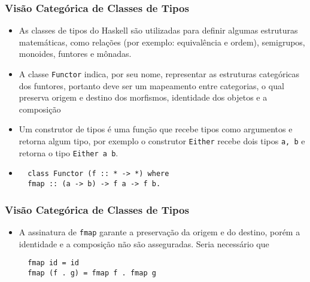 \documentclass{beamer}
\begin{document}
  \begin{frame}[fragile]
    \frametitle{Vis\~ao Categ\'orica de Classes de Tipos}
    \begin{itemize}
      \item As classes de tipos do Haskell s\~ao utilizadas para definir algumas
        estruturas matem\'aticas, como rela\c{c}\~oes (por exemplo: equival\^encia e ordem), semigrupos,
        monoides, funtores e m\^onadas.
        \pause
      \item A classe \texttt{Functor} indica, por seu nome, representar as estruturas categ\'oricas
dos funtores, portanto
deve ser um mapeamento entre categorias, o qual preserva origem e destino dos morfismos, identidade dos 
objetos e a composi\c{c}\~ao
        \pause
      \item Um construtor de tipos \'e uma fun\c{c}\~ao que recebe tipos como argumentos e retorna algum tipo, por exemplo
o construtor \texttt{Either} recebe dois tipos \texttt{a, b} e retorna o tipo
\texttt{Either a b}.
\item 
\begin{verbatim}
  class Functor (f :: * -> *) where
  fmap :: (a -> b) -> f a -> f b.
\end{verbatim}

    \end{itemize}
  \end{frame}

  \begin{frame}[fragile]
    \frametitle{Vis\~ao Categ\'orica de Classes de Tipos}
    \begin{itemize}
      \item A assinatura de \texttt{fmap} garante a preserva\c{c}\~ao da origem e do destino, por\'em
a identidade e a composi\c{c}\~ao n\~ao s\~ao asseguradas.
Seria necess\'ario que 
\begin{verbatim}
  fmap id = id
  fmap (f . g) = fmap f . fmap g
\end{verbatim}

    \end{itemize}
  \end{frame}
\end{document}
